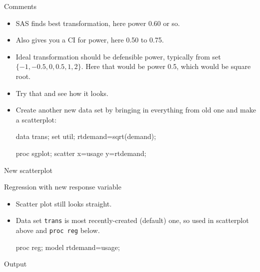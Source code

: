 \documentclass[unknownkeysallowed]{beamer}\usepackage[]{graphicx}\usepackage[]{color}
\begin{document}
\begin{frame}[fragile]{Comments}
  \begin{itemize}
  \item SAS finds best transformation, here power 0.60 or so.
  \item Also gives you a CI for power, here 0.50 to 0.75.
  \item Ideal transformation should be defensible power, typically
    from set $\{-1,-0.5,0,0.5,1,2\}$. Here that
    would be power 0.5, which would be square root.
  \item Try that and see how it looks.
  \item Create another new data set by bringing in everything from old
    one and make a scatterplot:
    
\begin{Datastep}
data trans;
  set util;
  rtdemand=sqrt(demand);        
\end{Datastep}
\begin{Sascode}[store=ddf]
proc sgplot;
  scatter x=usage y=rtdemand;
\end{Sascode}

  \end{itemize}
\end{frame}


\begin{frame}[fragile]{New scatterplot}

  
\end{frame}

\begin{frame}[fragile]{Regression with new response variable}

  \begin{itemize}
  \item Scatter plot still looks straight.
  \item Data set \texttt{trans} is most recently-created (default)
    one, so used in scatterplot above and \texttt{proc reg} below.
    
    \begin{Sascode}[store=ddg]
proc reg;
  model rtdemand=usage;
    \end{Sascode}
  \end{itemize}
\end{frame}

\begin{frame}[fragile]{Output}

  
\end{frame}
\end{document}
